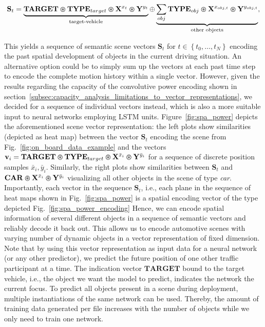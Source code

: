 \begin{equation}
	\label{eq:conv_power_enc}
  \mathbf{S}_{t} = \underbrace{\mathbf{TARGET}\varoast \mathbf{TYPE}_{target} \varoast \mathbf{X}^{x_{t}} \varoast \mathbf{Y}^{y_{t}}}_{\textrm{target-vehicle}} \oplus \underbrace{\sum_{obj} \mathbf{TYPE}_{obj} \varoast \mathbf{X}^{x_{obj,t}} \varoast \mathbf{Y}^{y_{obj,t}}}_{\textrm{other objects}},
\end{equation}

This yields a sequence of semantic scene vectors $\mathbf{S}_{t}$ for $t \in \left\{t_{0}, \ldots, t_{N} \right\}$ encoding the past spatial development of objects in the current driving situation.
An alternative option could be to simply sum up the vectors at each past time step to encode the complete motion history within a single vector.
However, given the results regarding the capacity of the convolutive power encoding shown in section~\ref{subsec:capacity_analysis_limitations_to_vector_representations}, we decided for a sequence of individual vectors instead, which is also a more suitable input to neural networks employing \ac{LSTM} units.
Figure~\ref{fig:spa_power} depicts the aforementioned scene vector representation: the left plots show similarities (depicted as heat map) between the vector $\mathbf{S}_{t}$ encoding the scene from Fig.~\ref{fig:on_board_data_example} and the vectors $ \mathbf{v}_{i}=\mathbf{TARGET}\varoast \mathbf{TYPE}_{target} \varoast \mathbf{X}^{\bar{x}_{i}} \varoast \mathbf{Y}^{\bar{y}_{i}}$ for a sequence of discrete position samples ${\bar{x}_{i}, \bar{y}_{i}}$.
Similarly, the right plots show similarities between $\mathbf{S}_{t}$ and $\mathbf{CAR} \varoast \mathbf{X}^{\bar{x}_{i}} \varoast \mathbf{Y}^{\bar{y}_{i}}$ visualizing all other objects in the scene of type \emph{car}.
Importantly, each vector in the sequence $ \mathbf{S}_{t}$, i.e., each plane in the sequence of heat maps shown in Fig.~\ref{fig:spa_power} is a spatial encoding vector of the type depicted Fig.~\ref{fig:spa_power_encoding}
Hence, we can encode spatial information of several different objects in a sequence of semantic vectors and reliably decode it back out.
This allows us to encode automotive scenes with varying number of dynamic objects in a vector representation of fixed dimension.
Note that by using this vector representation as input data for a neural network (or any other predictor), we predict the future position of one other traffic participant at a time.
The indication vector $\mathbf{TARGET}$ bound to the target vehicle, i.e., the object we want the model to predict, indicates the network the current focus.
To predict all objects present in a scene during deployment, multiple instantiations of the same network can be used.
Thereby, the amount of training data generated per file increases with the number of objects while we only need to train one network.

